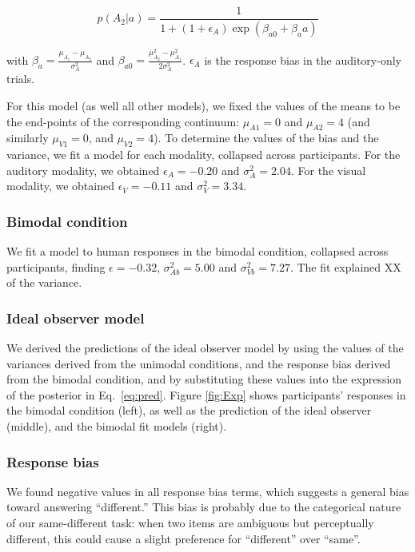 \documentclass[10pt,letterpaper]{article}
\begin{document}
\begin{equation}
p(A_2 | a)=\frac{1}{1+(1+\epsilon_A)\exp(\beta_{a0}+\beta_aa)}
\end{equation}

with $\beta_a=\frac{\mu_{A_1}-\mu_{A_2}}{\sigma^2_{A}}$ and  $\beta_{a0}=\frac{\mu^2_{A_2}-\mu^2_{A_1}}{2\sigma^2_{A}}$. $\epsilon_A$ is the response bias in the auditory-only trials.

For this model (as well all other models), we fixed the values of the means to be the end-points of the corresponding continuum: $\mu_{A1}=0$ and $\mu_{A2}=4$ (and similarly $\mu_{V1}=0$, and $\mu_{V2}=4$). To determine the values of the bias and the variance, we fit a model for each modality, collapsed across participants. For the auditory modality, we obtained $\epsilon_A=-0.20$ and $\sigma^2_A=2.04$. For the visual modality, we obtained $\epsilon_V=-0.11$ and $\sigma^2_V=3.34$.

\subsubsection{Bimodal condition}
We fit a model to human responses in the bimodal condition, collapsed across participants, finding $\epsilon=-0.32$, $\sigma^2_{Ab}=5.00$ and $\sigma^2_{Vb}=7.27$. The fit explained XX of the variance.

\subsubsection{Ideal observer model}

We derived the predictions of the ideal observer model by using the values of the variances derived from the unimodal conditions, and the response bias derived from the bimodal condition, and by substituting these values into the expression of the posterior in Eq.~\ref{eq:pred}. 
Figure \ref{fig:Exp} shows participants' responses in the bimodal condition (left), as well as the prediction of the ideal observer (middle), and the bimodal fit models (right).

\subsubsection{Response bias}

We found negative values in all response bias terms, which suggests a general bias toward answering ``different.''  This bias is probably due to the categorical nature of our same-different task: when two items are ambiguous but perceptually different, this could cause a slight preference for ``different'' over ``same''.
\end{document}
